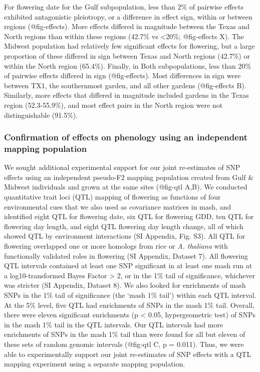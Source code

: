 \documentclass[
  9pt,
  twocolumn,
  twoside]{pnas-new}
\begin{document}
For flowering date for the Gulf subpopulation, less than 2\% of pairwise
effects exhibited antagonistic pleiotropy, or a difference in effect
sign, within or between regions (@fig-effects). More effects differed in
magnitude between the Texas and North regions than within these regions
(42.7\% vs \textless20\%; @fig-effects X). The Midwest population had
relatively few significant effects for flowering, but a large proportion
of these differed in sign between Texas and North regions (42.7\%) or
within the North region (65.4\%). Finally, in Both subpopulations, less
than 20\% of pairwise effects differed in sign (@fig-effects). Most
differences in sign were between TX1, the southernmost garden, and all
other gardens (@fig-effects B). Similarly, more effects that differed in
magnitude included gardens in the Texas region (52.3-55.9\%), and most
effect pairs in the North region were not distinguishable (91.5\%).

\subsubsection{Confirmation of effects on phenology using an independent
mapping
population}\label{confirmation-of-effects-on-phenology-using-an-independent-mapping-population}

We sought additional experimental support for our joint re-estimates of
SNP effects using an independent pseudo-F2 mapping population created
from Gulf \& Midwest individuals and grown at the same sites (@fig-qtl
A,B). We conducted quantitative trait loci (QTL) mapping of flowering as
functions of four environmental cues that we also used as covariance
matrices in mash, and identified eight QTL for flowering date, six QTL
for flowering GDD, ten QTL for flowering day length, and eight QTL
flowering day length change, all of which showed QTL by environment
interactions (SI Appendix, Fig. S3). All QTL for flowering overlapped
one or more homologs from rice or \emph{A. thaliana} with functionally
validated roles in flowering (SI Appendix, Dataset 7). All flowering QTL
intervals contained at least one SNP significant in at least one mash
run at a log10-transformed Bayes Factor \textgreater{} 2, or in the 1\%
tail of significance, whichever was stricter (SI Appendix, Dataset 8).
We also looked for enrichments of mash SNPs in the 1\% tail of
significance (the `mash 1\% tail') within each QTL interval. At the 5\%
level, five QTL had enrichments of SNPs in the mash 1\% tail. Overall,
there were eleven significant enrichments (p \textless{} 0.05,
hypergeometric test) of SNPs in the mash 1\% tail in the QTL intervals.
Our QTL intervals had more enrichments of SNPs in the mash 1\% tail than
were found for all but eleven of these sets of random genomic intervals
(@fig-qtl C, p = 0.011). Thus, we were able to experimentally support
our joint re-estimates of SNP effects with a QTL mapping experiment
using a separate mapping population.
\end{document}
